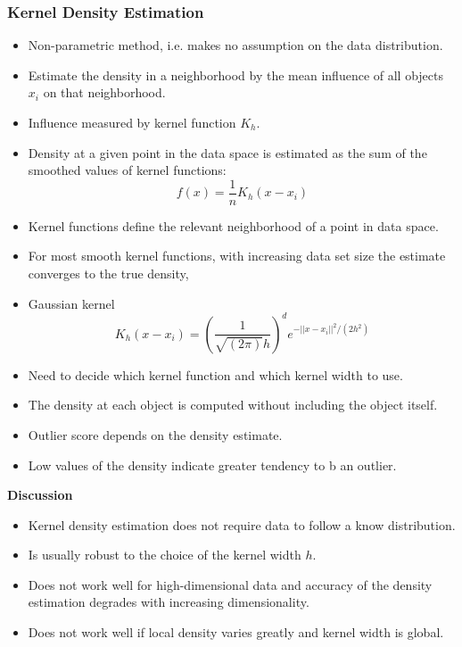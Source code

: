 \documentclass{article}
\begin{document}
\subsubsection{Kernel Density Estimation}
\begin{itemize}
  \item Non-parametric method, i.e. makes no assumption on the data distribution.
  \item Estimate the density in a neighborhood by the mean influence of all objects $x_i$ on that neighborhood.
  \item Influence measured by kernel function $K_h$.
  \item Density at a given point in the data space is estimated as the sum of the smoothed values of kernel functions:
  $$f(x) = \frac{1}{n} K_h(x-x_i)$$
  \item Kernel functions define the relevant neighborhood of a point in data space.
  \item For most smooth kernel functions, with increasing data set size the estimate converges to the true density,
  \item Gaussian kernel 
  $$K_h(x-x_i) = (\frac{1}{\sqrt{(2\pi)}h})^d e^{-||x-x_i||^2/(2h^2)}$$
  \item Need to decide which kernel function and which kernel width to use.
  \item The density at each object is computed without including the object itself.
  \item Outlier score depends on the density estimate.
  \item Low values of the density indicate greater tendency to b an outlier.
\end{itemize}

\textbf{Discussion}
\begin{itemize}
  \item Kernel density estimation does not require data to follow a know distribution.
  \item Is usually robust to the choice of the kernel width $h$.
  \item Does not work well for high-dimensional data and accuracy of the density estimation degrades with increasing dimensionality.
  \item Does not work well if local density varies greatly and kernel width is global.
\end{itemize}
\end{document}
